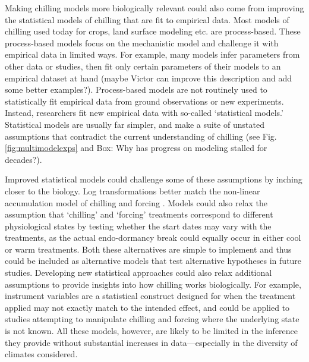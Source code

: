 \documentclass[11pt]{article}
\begin{document}
Making chilling models more biologically relevant could also come from improving the statistical models of chilling that are fit to empirical data. Most models of chilling used today for crops, land surface modeling etc. are process-based. These process-based models focus on the mechanistic model and challenge it with empirical data in limited ways. For example, many models infer parameters from other data or studies, then fit only certain parameters of their models to an empirical dataset at hand \citep{richardson1974} (maybe Victor can improve this description and add some better examples?). Process-based models are not routinely used to statistically fit empirical data from ground observations or new experiments. %
Instead, researchers fit new empirical data with so-called `statistical models.' Statistical models are usually far simpler, and make a suite of unstated assumptions that contradict the current understanding of chilling 
(see Fig.\ref{fig:multimodelexps} and Box: Why has progress on modeling stalled for decades?). %

Improved statistical models could challenge some of these assumptions by inching closer to the biology. Log transformations better match the non-linear accumulation model of chilling and forcing \citep{decsens}. Models could also relax the assumption that ‘chilling’ and ‘forcing’
treatments correspond to different physiological states by testing whether the start dates may vary with the treatments, as the actual endo-dormancy break could equally occur in either cool or warm treatments. 
Both these alternatives are simple to implement and thus could be included as alternative models that test alternative hypotheses in future studies. 
Developing new statistical approaches could also relax additional assumptions to provide insights into how chilling works biologically. For example, instrument variables are a statistical construct designed for when the treatment applied may not exactly match to the intended effect, and could be applied to studies attempting to manipulate chilling and forcing where the underlying state is not known. All these models, however, are likely to be limited in the inference they provide without substantial increases in data---especially in the diversity of climates considered. 
\end{document}
